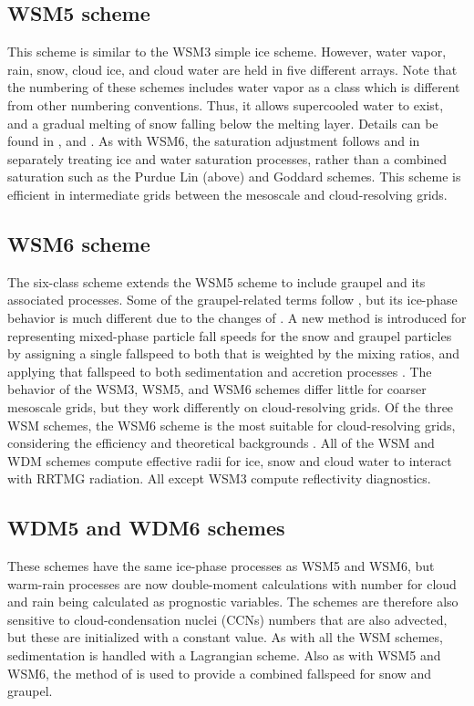 \subsection{WSM5 scheme}

This scheme is similar to the WSM3 simple ice scheme. However, water vapor, rain, snow, cloud ice,
and cloud water are held in five different arrays. Note that the numbering of these schemes includes water vapor as a class which is different from other
numbering conventions. Thus, it allows supercooled water to exist, and
a gradual melting of snow falling below the melting layer. Details can be found in 
\citet{hong04}, and \citet{honglim06}. As with WSM6, the saturation adjustment follows \citet{dudhia89} and \citet{hong98} in separately treating ice and water saturation processes, rather than a combined saturation such as the Purdue Lin (above) and Goddard \citep{tao89} schemes. This scheme is efficient in intermediate grids between the mesoscale and cloud-resolving grids.

\subsection{WSM6 scheme}

The six-class scheme extends the WSM5 scheme to include graupel and its associated processes.
Some of the graupel-related terms follow \citet{lin83}, but its ice-phase behavior is much different due to the changes of \citet{hong04}. A new method is introduced for representing mixed-phase particle fall speeds for the snow and graupel particles by assigning a single fallspeed to both that is weighted by the mixing ratios, and applying that fallspeed to both sedimentation and accretion processes \citep{dudhia08}. The behavior of the WSM3, WSM5, and WSM6 schemes differ little for coarser mesoscale grids, but they work differently on cloud-resolving grids. Of the three WSM schemes, the WSM6 scheme is the most suitable for cloud-resolving grids, considering the efficiency and theoretical backgrounds \citep{honglim06}. All of the WSM and WDM schemes compute effective radii for ice, snow and cloud water to interact with RRTMG radiation. All except WSM3 compute reflectivity diagnostics.

\subsection{WDM5 and WDM6 schemes}

These schemes have the same ice-phase processes as WSM5 and WSM6, but warm-rain processes are now double-moment calculations \citep{lim10} with number for cloud and rain being calculated as prognostic variables. The schemes are therefore also sensitive to cloud-condensation nuclei (CCNs) numbers that are also advected, but these are initialized with a constant value. As with all the WSM schemes, sedimentation is handled with a Lagrangian scheme. Also as with WSM5 and WSM6, the method of \citet{dudhia08} is used
to provide a combined fallspeed for snow and graupel.

